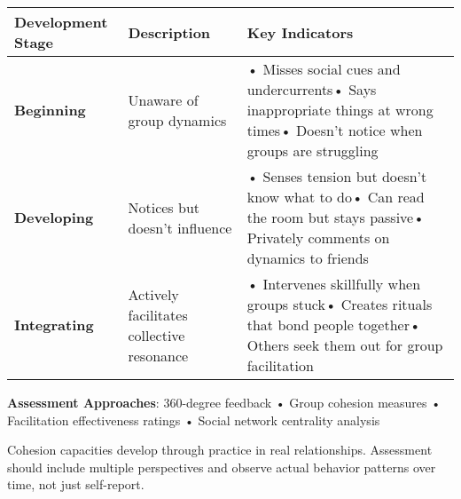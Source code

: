 \documentclass[
  a4paper,
]{report}
\begin{document}
\begin{longtable}[]{@{}
  >{\raggedright\arraybackslash}p{}
  >{\raggedright\arraybackslash}p{}
  >{\raggedright\arraybackslash}p{}@{}}
\toprule\noalign{}
\begin{minipage}[b]{\linewidth}\raggedright
Development Stage
\end{minipage} & \begin{minipage}[b]{\linewidth}\raggedright
Description
\end{minipage} & \begin{minipage}[b]{\linewidth}\raggedright
Key Indicators
\end{minipage} \\
\midrule\noalign{}
\endhead
\bottomrule\noalign{}
\endlastfoot
\textbf{Beginning} & Unaware of group dynamics & • Misses social cues
and undercurrents• Says inappropriate things at wrong times• Doesn't
notice when groups are struggling \\
\textbf{Developing} & Notices but doesn't influence & • Senses tension
but doesn't know what to do• Can read the room but stays passive•
Privately comments on dynamics to friends \\
\textbf{Integrating} & Actively facilitates collective resonance & •
Intervenes skillfully when groups stuck• Creates rituals that bond
people together• Others seek them out for group facilitation \\
\end{longtable}

\textbf{Assessment Approaches}: 360-degree feedback • Group cohesion
measures • Facilitation effectiveness ratings • Social network
centrality analysis

\begin{tcolorbox}[enhanced jigsaw, toprule=.15mm, rightrule=.15mm, breakable, opacitybacktitle=0.6, colframe=quarto-callout-note-color-frame, colback=white, titlerule=0mm, arc=.35mm, leftrule=.75mm, opacityback=0, colbacktitle=quarto-callout-note-color!10!white, bottomrule=.15mm, coltitle=black, toptitle=1mm, bottomtitle=1mm, title=\textcolor{quarto-callout-note-color}{\faInfo}\hspace{0.5em}{Relational Note}, left=2mm]

Cohesion capacities develop through practice in real relationships.
Assessment should include multiple perspectives and observe actual
behavior patterns over time, not just self-report.

\end{tcolorbox}
\end{document}
